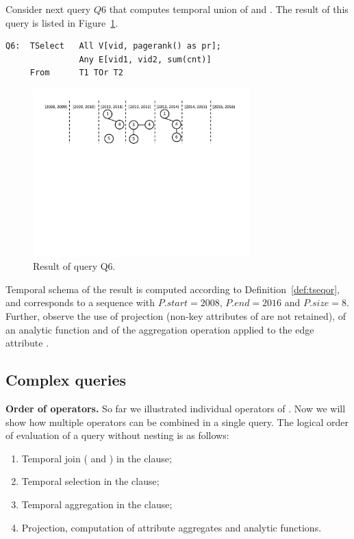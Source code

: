 Consider next query $Q6$ that computes temporal union of 
and .  The result of this query is listed in
Figure~\ref{fig:q6}.

\begin{small}
\begin{verbatim}
Q6:  TSelect   All V[vid, pagerank() as pr]; 
               Any E[vid1, vid2, sum(cnt)]
     From      T1 TOr T2
\end{verbatim}
\end{small}

\begin{figure}
\centering
\includegraphics[width=3.3in]{figs/q6.pdf}
\caption{Result of query Q6.}
\label{fig:q6}
\end{figure}

Temporal schema of the result is computed according to
Definition~\ref{def:tseqor}, and corresponds to a sequence with
$P.start = 2008$, $P.end=2016$ and $P.size=8$.  Further, observe the
use of projection (non-key attributes of  are not retained),
of an analytic function  and of the aggregation
operation  applied to the edge attribute .

\subsection{Complex queries}
\label{sec:example:complex}

{\bf Order of operators.} So far we illustrated individual operators
of \ql.  Now we will show how multiple operators can be combined in a
single query.  The logical order of evaluation of a \ql query without
nesting is as follows:

\begin{enumerate}
\item Temporal join ( and ) in the 
  clause;
\item Temporal selection in the  clause;
\item Temporal aggregation in the  clause;
\item Projection, computation of attribute aggregates and analytic
  functions.
\end{enumerate}

